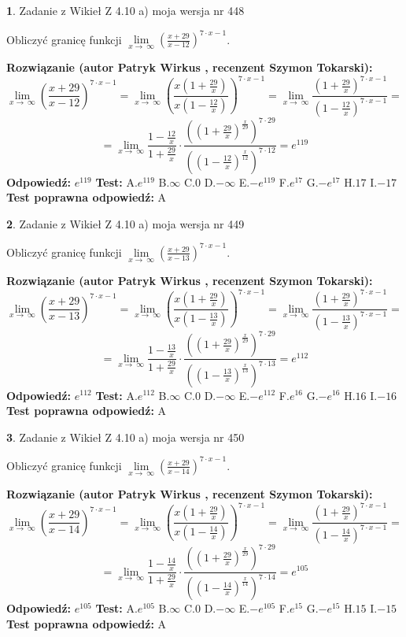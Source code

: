 \documentclass[12pt, a4paper]{article}
\theoremstyle{definition} %
\newtheorem{zad}{}
\newcommand{\zadStart}[1]{\begin{zad}#1\newline}
\newcommand{\zadStop}{\end{zad}}
\newcommand{\rozwStart}[2]{\noindent \textbf{Rozwiązanie (autor #1 , recenzent #2): }\newline}
\newcommand{\rozwStop}{\newline}
\newcommand{\odpStart}{\noindent \textbf{Odpowiedź:}\newline}
\newcommand{\odpStop}{\newline}
\newcommand{\testStart}{\noindent \textbf{Test:}\newline}
\newcommand{\testStop}{\newline}
\newcommand{\kluczStart}{\noindent \textbf{Test poprawna odpowiedź:}\newline}
\newcommand{\kluczStop}{\newline}
\begin{document}
\zadStart{Zadanie z Wikieł Z 4.10 a) moja wersja nr 448}

Obliczyć granicę funkcji  $\lim\limits_{x\to\ \infty}(\frac{x+29}{x-12})^{7\cdot x-1}$.
\zadStop
\rozwStart{Patryk Wirkus}{Szymon Tokarski}
$$\lim\limits_{x\to\ \infty}(\frac{x+29}{x-12})^{7\cdot x-1} = \lim\limits_{x\to\ \infty}(\frac{x(1+\frac{29}{x})}{x(1-\frac{12}{x})})^{7\cdot x-1}=\lim\limits_{x\to\ \infty}\frac{(1+\frac{29}{x})^{7\cdot x-1}}{(1-\frac{12}{x})^{7\cdot x-1}}=$$
$$=\lim\limits_{x\to\ \infty}\frac{1-\frac{12}{x}}{1+\frac{29}{x}}\cdot\frac{((1+\frac{29}{x})^{\frac{x}{29}})^{7\cdot29}}{((1-\frac{12}{x})^{\frac{x}{12}})^{7\cdot12}}=e^{119}$$
\rozwStop
\odpStart
$e^{119}$
\odpStop
\testStart
A.$e^{119}$ B.$\infty$ C.$0$ D.$-\infty$ E.$-e^{119}$
F.$e^{17}$ G.$-e^{17}$
H.$17$
I.$-17$
\testStop
\kluczStart
A
\kluczStop



\zadStart{Zadanie z Wikieł Z 4.10 a) moja wersja nr 449}

Obliczyć granicę funkcji  $\lim\limits_{x\to\ \infty}(\frac{x+29}{x-13})^{7\cdot x-1}$.
\zadStop
\rozwStart{Patryk Wirkus}{Szymon Tokarski}
$$\lim\limits_{x\to\ \infty}(\frac{x+29}{x-13})^{7\cdot x-1} = \lim\limits_{x\to\ \infty}(\frac{x(1+\frac{29}{x})}{x(1-\frac{13}{x})})^{7\cdot x-1}=\lim\limits_{x\to\ \infty}\frac{(1+\frac{29}{x})^{7\cdot x-1}}{(1-\frac{13}{x})^{7\cdot x-1}}=$$
$$=\lim\limits_{x\to\ \infty}\frac{1-\frac{13}{x}}{1+\frac{29}{x}}\cdot\frac{((1+\frac{29}{x})^{\frac{x}{29}})^{7\cdot29}}{((1-\frac{13}{x})^{\frac{x}{13}})^{7\cdot13}}=e^{112}$$
\rozwStop
\odpStart
$e^{112}$
\odpStop
\testStart
A.$e^{112}$ B.$\infty$ C.$0$ D.$-\infty$ E.$-e^{112}$
F.$e^{16}$ G.$-e^{16}$
H.$16$
I.$-16$
\testStop
\kluczStart
A
\kluczStop



\zadStart{Zadanie z Wikieł Z 4.10 a) moja wersja nr 450}

Obliczyć granicę funkcji  $\lim\limits_{x\to\ \infty}(\frac{x+29}{x-14})^{7\cdot x-1}$.
\zadStop
\rozwStart{Patryk Wirkus}{Szymon Tokarski}
$$\lim\limits_{x\to\ \infty}(\frac{x+29}{x-14})^{7\cdot x-1} = \lim\limits_{x\to\ \infty}(\frac{x(1+\frac{29}{x})}{x(1-\frac{14}{x})})^{7\cdot x-1}=\lim\limits_{x\to\ \infty}\frac{(1+\frac{29}{x})^{7\cdot x-1}}{(1-\frac{14}{x})^{7\cdot x-1}}=$$
$$=\lim\limits_{x\to\ \infty}\frac{1-\frac{14}{x}}{1+\frac{29}{x}}\cdot\frac{((1+\frac{29}{x})^{\frac{x}{29}})^{7\cdot29}}{((1-\frac{14}{x})^{\frac{x}{14}})^{7\cdot14}}=e^{105}$$
\rozwStop
\odpStart
$e^{105}$
\odpStop
\testStart
A.$e^{105}$ B.$\infty$ C.$0$ D.$-\infty$ E.$-e^{105}$
F.$e^{15}$ G.$-e^{15}$
H.$15$
I.$-15$
\testStop
\kluczStart
A
\kluczStop
\end{document}
